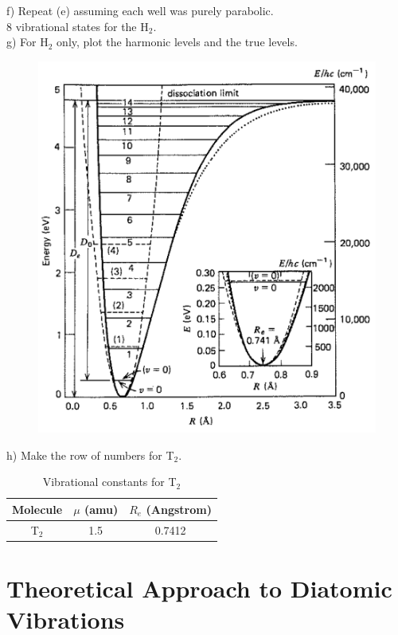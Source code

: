 \documentclass{article}
\begin{document}
\noindent f) Repeat (e) assuming each well was purely parabolic.
\\

{\color{blue} 8 vibrational states for the H$_2$.}
\\

\noindent g) For H$_2$ only, plot the harmonic levels and the true levels.
\\
\begin{figure}[H]
  \centering
  \includegraphics[scale=0.15]{harmonic_true.png}
\end{figure}

\noindent h) Make the row of numbers for T$_2$.
\begin{table}[H]
  \caption{Vibrational constants for T$_2$}
  \centering
  \begin{tabular}{c|cc}
    Molecule &$\mu$ (amu) & $R_e$ (Angstrom)\\
    \hline
    T$_2$ & 1.5 & 0.7412 \\
  \end{tabular}
\end{table}

\pagebreak

\section*{Theoretical Approach to Diatomic Vibrations}
\end{document}

